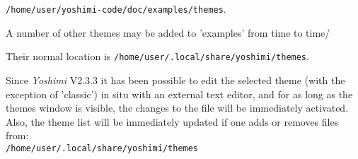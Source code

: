    \texttt{/home/user/yoshimi-code/doc/examples/themes}.

   A number of other themes may be added to 'examples' from time to time/

   Their normal location is \texttt{/home/user/.local/share/yoshimi/themes}.

   Since \textsl{Yoshimi} V2.3.3 it has been possible to edit the selected theme
   (with the exception of 'classic') in situ with an external text editor, and for
   as long as the themes window is visible, the changes to the file will be
   immediately activated. Also, the theme list will be immediately updated if one
   adds or removes files from:\\ \texttt{/home/user/.local/share/yoshimi/themes}

